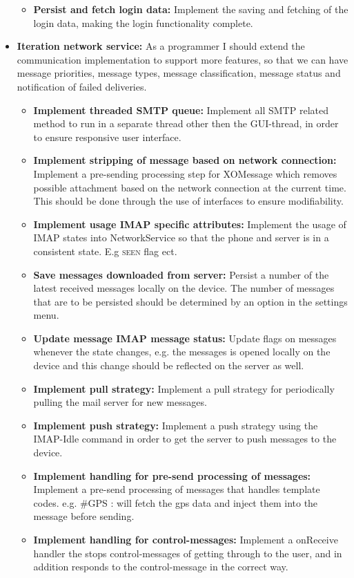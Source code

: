 \begin{itemize}
\begin{itemize}
\item{}\textbf{Persist and fetch login data:} Implement the saving and fetching of the login data, making the login functionality complete.
\end{itemize}
\item{}\textbf{Iteration network service:} As a programmer I should extend the communication implementation to support more features, so that we can have message priorities, message types, message classification, message status and notification of failed deliveries.
\begin{itemize}
\item{}\textbf{Implement threaded SMTP queue:} Implement all SMTP related method to run in a separate thread other then the GUI-thread, in order to ensure responsive user interface.
\item{}\textbf{Implement stripping of message based on network connection:} Implement a pre-sending processing step for XOMessage which removes possible attachment based on the network connection at the current time. This should be done through the use of interfaces to ensure modifiability. 
\item{}\textbf{Implement usage IMAP specific attributes:} Implement the usage of IMAP states into NetworkService so that the phone and server is in a consistent state. E.g \textsc{seen} flag ect. 
\item{}\textbf{Save messages downloaded from server:} Persist a number of the latest received messages locally on the device. The number of messages that are to be persisted should be determined by an option in the settings menu.
\item{}\textbf{Update message IMAP message status:} Update flags on messages whenever the state changes, e.g. the messages is opened locally on the device and this change should be reflected on the server as well.
\item{}\textbf{Implement pull strategy:} Implement a pull strategy for periodically pulling the mail server for new messages.
\item{}\textbf{Implement push strategy:} Implement a push strategy using the IMAP-Idle command in order to get the server to push messages to the device. 
\item{}\textbf{Implement handling for pre-send processing of messages:} Implement a pre-send processing of messages that handles template codes. e.g. \#GPS : will fetch the gps data and inject them into the message before sending. 
\item{}\textbf{Implement handling for control-messages:} Implement a onReceive handler the stops control-messages of getting through to the user, and in addition responds to the control-message in the correct way.

\end{itemize}
\end{itemize}

